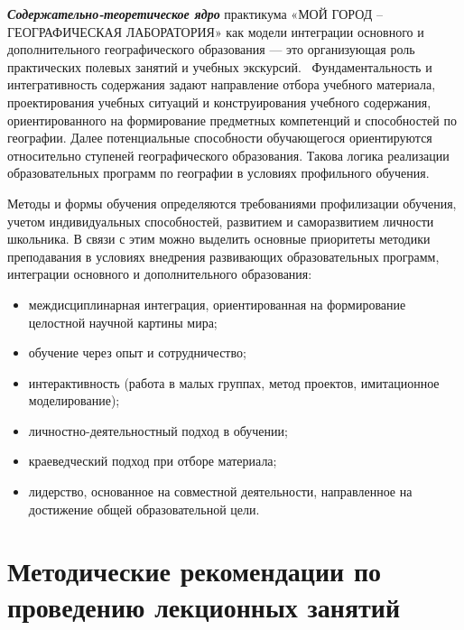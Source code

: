 \documentclass[
  11pt,
]{book}
\begin{document}
\textbf{\emph{Содержательно-теоретическое ядро}} практикума «МОЙ ГОРОД -- ГЕОГРАФИЧЕСКАЯ ЛАБОРАТОРИЯ» как модели интеграции основного и дополнительного географического образования --- это организующая роль практических полевых занятий и учебных экскурсий.~ Фундаментальность и интегративность содержания задают направление отбора учебного материала, проектирования учебных ситуаций и конструирования учебного содержания, ориентированного на формирование предметных компетенций и способностей по географии. Далее потенциальные способности обучающегося ориентируются относительно ступеней географического образования. Такова логика реализации образовательных программ по географии в условиях профильного обучения.

Методы и формы обучения определяются требованиями профилизации обучения, учетом индивидуальных способностей, развитием и саморазвитием личности школьника. В связи с этим можно выделить основные приоритеты методики преподавания в условиях внедрения развивающих образовательных программ, интеграции основного и дополнительного образования:

\begin{itemize}
\item
  междисциплинарная интеграция, ориентированная на формирование целостной научной картины мира;
\item
  обучение через опыт и сотрудничество;
\item
  интерактивность (работа в малых группах, метод проектов, имитационное моделирование);
\item
  личностно-деятельностный подход в обучении;
\item
  краеведческий подход при отборе материала;
\item
  лидерство, основанное на совместной деятельности, направленное на достижение общей образовательной цели.
\end{itemize}

\section*{Методические рекомендации по проведению лекционных занятий}\label{ux43cux435ux442ux43eux434ux438ux447ux435ux441ux43aux438ux435-ux440ux435ux43aux43eux43cux435ux43dux434ux430ux446ux438ux438-ux43fux43e-ux43fux440ux43eux432ux435ux434ux435ux43dux438ux44e-ux43bux435ux43aux446ux438ux43eux43dux43dux44bux445-ux437ux430ux43dux44fux442ux438ux439}
\end{document}
